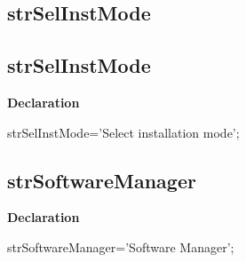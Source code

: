 \documentclass{report}
\newif\ifpdf
\begin{document}
\subsection*{\large{\textbf{strSelInstMode}}\normalsize\hspace{1ex}\hrulefill}
\else
\subsection*{strSelInstMode}
\fi
\label{trstrings-strSelInstMode}
\begin{list}{}{
\setlength{\itemindent}{0cm}
\setlength{\listparindent}{0cm}
\setlength{\leftmargin}{\evensidemargin}
\addtolength{\leftmargin}{\tmplength}
\settowidth{\labelsep}{X}
\addtolength{\leftmargin}{\labelsep}
\setlength{\labelwidth}{\tmplength}
}
\item[\textbf{Declaration}\hfill]
\ifpdf
\begin{flushleft}
\fi
\begin{ttfamily}
strSelInstMode='Select installation mode';\end{ttfamily}

\ifpdf
\end{flushleft}
\fi

\end{list}
\ifpdf
\subsection*{\large{\textbf{strSoftwareManager}}\normalsize\hspace{1ex}\hrulefill}
\else
\subsection*{strSoftwareManager}
\fi
\label{trstrings-strSoftwareManager}
\begin{list}{}{
\setlength{\itemindent}{0cm}
\setlength{\listparindent}{0cm}
\setlength{\leftmargin}{\evensidemargin}
\addtolength{\leftmargin}{\tmplength}
\settowidth{\labelsep}{X}
\addtolength{\leftmargin}{\labelsep}
\setlength{\labelwidth}{\tmplength}
}
\item[\textbf{Declaration}\hfill]
\ifpdf
\begin{flushleft}
\fi
\begin{ttfamily}
strSoftwareManager='Software Manager';\end{ttfamily}

\ifpdf
\end{flushleft}
\fi

\end{list}
\ifpdf
\end{document}
